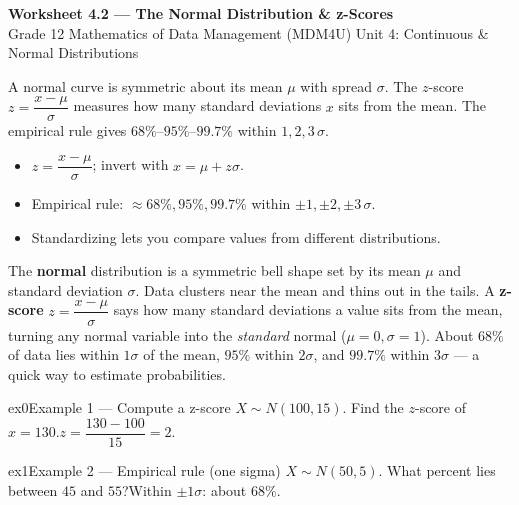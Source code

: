\documentclass[11pt]{article}
\begin{document}
\begin{center}
{\LARGE\bfseries\color{titleblue}Worksheet 4.2 --- The Normal Distribution \& z-Scores}\\[2pt]
{\small Grade 12 Mathematics of Data Management (MDM4U) \textperiodcentered{} Unit 4: Continuous \& Normal Distributions}
\end{center}

\begin{ideabox}
A normal curve is symmetric about its mean $\mu$ with spread $\sigma$. The $z$-score $z=\dfrac{x-\mu}{\sigma}$ measures how many standard deviations $x$ sits from the mean. The empirical rule gives $68\%$--$95\%$--$99.7\%$ within $1,2,3\,\sigma$.
\begin{itemize}[leftmargin=*,itemsep=2pt]
  \item $z=\dfrac{x-\mu}{\sigma}$; invert with $x=\mu+z\sigma$.
  \item Empirical rule: $\approx68\%,95\%,99.7\%$ within $\pm1,\pm2,\pm3\,\sigma$.
  \item Standardizing lets you compare values from different distributions.
\end{itemize}
\end{ideabox}

\begin{learnbox}
The \textbf{normal} distribution is a symmetric bell shape set by its mean $\mu$ and standard deviation $\sigma$. Data clusters near the mean and thins out in the tails.
A \textbf{z-score} $z=\dfrac{x-\mu}{\sigma}$ says how many standard deviations a value sits from the mean, turning any normal variable into the \emph{standard} normal ($\mu=0,\sigma=1$).
About $68\%$ of data lies within $1\sigma$ of the mean, $95\%$ within $2\sigma$, and $99.7\%$ within $3\sigma$ — a quick way to estimate probabilities.
\end{learnbox}


\begin{example}{ex0}{Example 1 --- Compute a z-score}
$X\sim N(100,15)$. Find the $z$-score of $x=130$.\soln $z=\dfrac{130-100}{15}=2$.
\end{example}

\begin{example}{ex1}{Example 2 --- Empirical rule (one sigma)}
$X\sim N(50,5)$. What percent lies between $45$ and $55$?\soln Within $\pm1\sigma$: about $68\%$.
\end{example}
\end{document}
